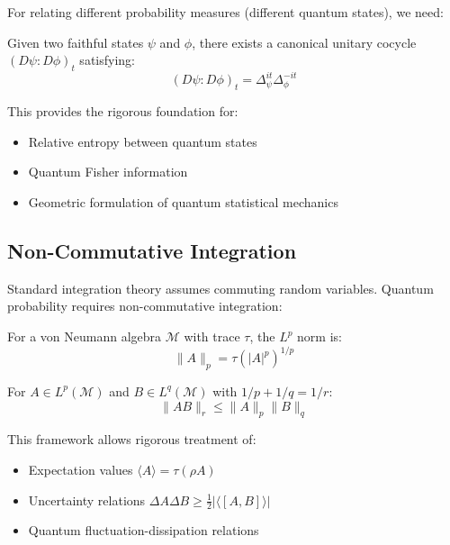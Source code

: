 For relating different probability measures (different quantum states), we need:

\begin{theorem}
Given two faithful states $\psi$ and $\phi$, there exists a canonical unitary cocycle $(D\psi : D\phi)_t$ satisfying:
\begin{equation}
    (D\psi : D\phi)_t = \Delta_\psi^{it} \Delta_\phi^{-it}
\end{equation}
\end{theorem}

This provides the rigorous foundation for:
\begin{itemize}
    \item Relative entropy between quantum states
    \item Quantum Fisher information
    \item Geometric formulation of quantum statistical mechanics
\end{itemize}

\subsection{Non-Commutative Integration}

Standard integration theory assumes commuting random variables. Quantum probability requires non-commutative integration:

\begin{definition}
For a von Neumann algebra $\mathcal{M}$ with trace $\tau$, the $L^p$ norm is:
\begin{equation}
    \|A\|_p = \tau(|A|^p)^{1/p}
\end{equation}
\end{definition}

\begin{theorem}
For $A \in L^p(\mathcal{M})$ and $B \in L^q(\mathcal{M})$ with $1/p + 1/q = 1/r$:
\begin{equation}
    \|AB\|_r \leq \|A\|_p \|B\|_q
\end{equation}
\end{theorem}

This framework allows rigorous treatment of:
\begin{itemize}
    \item Expectation values $\langle A \rangle = \tau(\rho A)$
    \item Uncertainty relations $\Delta A \Delta B \geq \frac{1}{2}|\langle [A,B] \rangle|$
    \item Quantum fluctuation-dissipation relations
\end{itemize}

